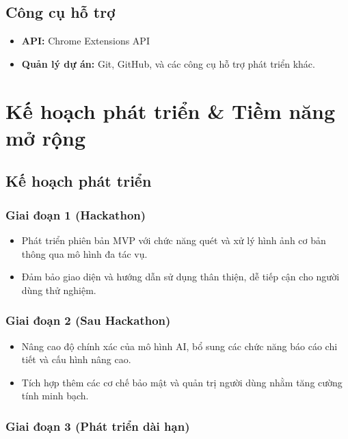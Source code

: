 \documentclass[12pt,a4paper]{article}
\begin{document}
\subsection{Công cụ hỗ trợ}

\begin{itemize}
  \item \textbf{API:} Chrome Extensions API
  
  \item \textbf{Quản lý dự án:} Git, GitHub, và các công cụ hỗ trợ phát triển khác.
\end{itemize}

\section{Kế hoạch phát triển \& Tiềm năng mở rộng}

\subsection{Kế hoạch phát triển}

\subsubsection{Giai đoạn 1 (Hackathon)}

\begin{itemize}
  \item Phát triển phiên bản MVP với chức năng quét và xử lý hình ảnh cơ bản thông qua mô hình đa tác vụ.
  
  \item Đảm bảo giao diện và hướng dẫn sử dụng thân thiện, dễ tiếp cận cho người dùng thử nghiệm.
\end{itemize}

\subsubsection{Giai đoạn 2 (Sau Hackathon)}

\begin{itemize}
  \item Nâng cao độ chính xác của mô hình AI, bổ sung các chức năng báo cáo chi tiết và cấu hình nâng cao.
  
  \item Tích hợp thêm các cơ chế bảo mật và quản trị người dùng nhằm tăng cường tính minh bạch.
\end{itemize}

\subsubsection{Giai đoạn 3 (Phát triển dài hạn)}
\end{document}
